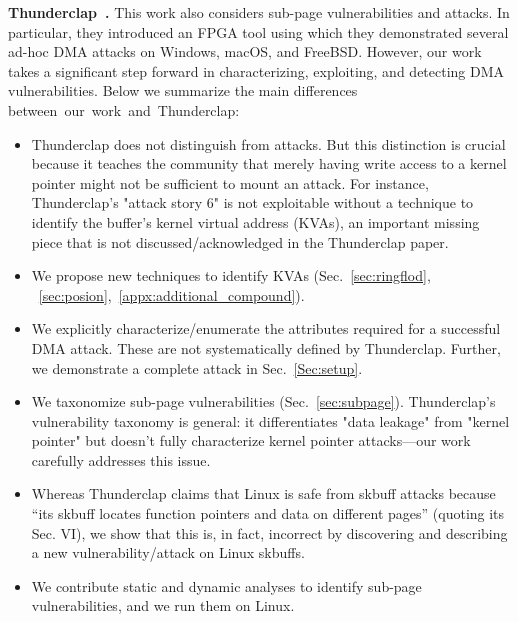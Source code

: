 \smallskip
\noindent\textbf{Thunderclap~\cite{thunder}.} This work also considers sub-page vulnerabilities and \simple attacks. In particular, they introduced an FPGA tool using which they demonstrated several ad-hoc \simple DMA attacks on Windows, macOS, and FreeBSD. However, our work takes a significant step forward in characterizing, exploiting, and detecting DMA vulnerabilities. Below we summarize the main differences \mbox{between our work and Thunderclap:}
\begin{itemize}

    \item Thunderclap does not distinguish \simple from \compound attacks. But this distinction is crucial because it teaches the community that merely having write access to a kernel pointer might not be sufficient to mount an attack. For instance, Thunderclap's "attack story 6" is not exploitable without a technique to identify the buffer's kernel virtual address (KVAs), an important missing piece that is not discussed/acknowledged in the Thunderclap paper.
    
    \item We propose new techniques to identify KVAs (Sec.~\ref{sec:ringflod}, ~\ref{sec:posion},~\ref{appx:additional_compound}).
    
    \item We explicitly characterize/enumerate the attributes required for a successful DMA attack. These are not systematically defined by Thunderclap. Further, we demonstrate a complete \compound attack in Sec.~\ref{Sec:setup}.
    
    \item We taxonomize sub-page vulnerabilities (Sec.~\ref{sec:subpage}). Thunderclap's vulnerability taxonomy is general: it differentiates "data leakage" from "kernel pointer" but doesn't fully characterize kernel pointer attacks---our work carefully addresses this issue.
    
    \item Whereas Thunderclap claims that Linux is safe from skbuff attacks because ``its skbuff locates function pointers and data on different pages'' (quoting its Sec. VI), we show that this is, in fact, incorrect by discovering and describing a new vulnerability/attack on Linux skbuffs.
    
    \item We contribute static and dynamic analyses to identify sub-page vulnerabilities, and we run them on Linux.
    
\end{itemize}





